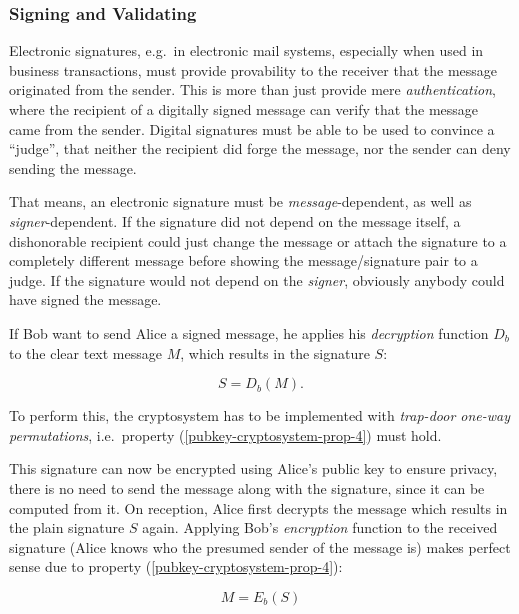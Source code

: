 \subsubsection{Signing and Validating}

Electronic  signatures, e.g.~in electronic  mail systems,  especially when
used in  business transactions, must  provide provability to  the receiver
that  the message  originated from  the sender.   This is  more  than just
provide  mere \emph{authentication},  where the  recipient of  a digitally
signed message can  verify that the message came  from the sender. Digital
signatures must be  able to be used to convince  a ``judge'', that neither
the recipient did  forge the message, nor the sender  can deny sending the
message.

That means,  an electronic signature must  be \emph{message}-dependent, as
well as  \emph{signer}-dependent. If the  signature did not depend  on the
message itself, a dishonorable recipient  could just change the message or
attach the signature to a  completely different message before showing the
message/signature pair  to a judge. If  the signature would  not depend on
the \emph{signer}, obviously anybody could have signed the message.

\medskip

If   Bob  want  to   send  Alice   a  signed   message,  he   applies  his
\emph{decryption}  function $D_b$  to the  clear text  message  $M$, which
results in the signature $S$:

\begin{equation*}
  S = D_b(M).
\end{equation*}

To   perform  this,   the  cryptosystem   has  to   be   implemented  with
\emph{trap-door         one-way        permutations},        i.e.~property
(\ref{pubkey-cryptosystem-prop-4}) must hold.

This signature  can now  be encrypted using  Alice's public key  to ensure
privacy, there  is no need to  send the message along  with the signature,
since it can  be computed from it. On reception,  Alice first decrypts the
message which  results in the  plain signature $S$ again.   Applying Bob's
\emph{encryption} function to the  received signature (Alice knows who the
presumed sender  of the  message is) makes  perfect sense due  to property
(\ref{pubkey-cryptosystem-prop-4}):

\begin{equation*}
  M = E_b(S)
\end{equation*}

